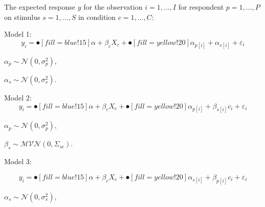 \documentclass{beamer}
\begin{document}
\begin{frame}
	\begin{footnotesize}
		The expected response $y$ for the observation $i = 1, \ldots, I$ for respondent $p = 1,\ldots, P$ on stimulus $s = 1,\ldots, S$ in condition $c= 1,\ldots, C$:
	\end{footnotesize}
	\footnotesize
	
	\vspace{3mm}
	Model 1:
	\begin{equation*}\label{AccuracyMin}
		y_{i} = \spot[fill =blue!15]{\alpha + \beta_c X_c}  + \spot[fill=yellow!20]{\alpha_{p[i]} +  \alpha_{s[i]} + \varepsilon_{i}}
	\end{equation*}
	\begin{centering}
		
		$\alpha_p \sim \mathcal{N}(0, \sigma_p^2)$,
		
	\end{centering}
	
	\begin{centering}
		
		$\alpha_s \sim \mathcal{N}(0, \sigma_s^2)$.
		
	\end{centering}
	
	
	
	Model 2: 
	\begin{equation*}\label{Accuracy5}
		y_{i} = \spot[fill =blue!15]{\alpha + \beta_c X_c}  + \spot[fill=yellow!20]{ \alpha_{p[i]} +  \beta_{s[i]}c_{i} + \varepsilon_{i}}
	\end{equation*}
	
	\begin{centering}
		$\alpha_p \sim \mathcal{N}(0, \sigma_p^2)$,
		
	\end{centering}
	
	\begin{centering}
		
		$\beta_s \sim \mathcal{MVN}(0, \Sigma_{sc})$.
		
	\end{centering}
	
	Model 3: 
	
	\begin{equation*}
		y_{i} = \spot[fill =blue!15]{\alpha + \beta_c X_c}  + \spot[fill=yellow!20]{\alpha_{s[i]} +  \beta_{p[i]}c_{i} + \varepsilon_{i}}
	\end{equation*}
	
	\begin{centering}
		$\alpha_s \sim \mathcal{N}(0, \sigma_s^2)$,
		

\end{centering}
\end{frame}
\end{document}
